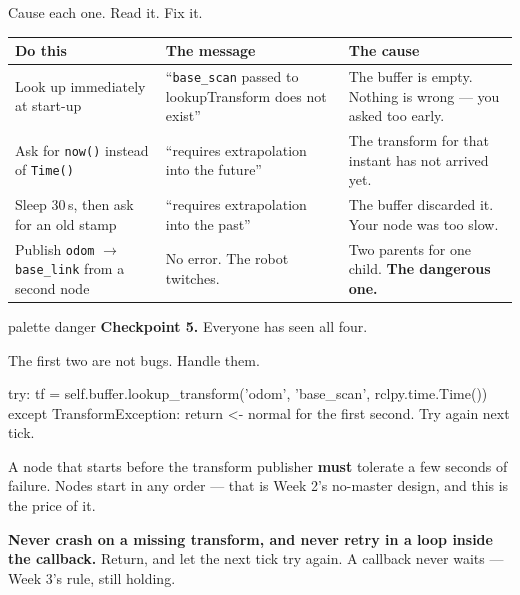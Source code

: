 \documentclass[aspectratio=169]{beamer}
\begin{document}
\begin{frame}{Cause each one. Read it. Fix it.}
  \footnotesize
  \begin{center}
  \begin{tabular}{@{}p{3.3cm}p{3.6cm}p{3.9cm}@{}}
    \toprule
    \textbf{Do this} & \textbf{The message} & \textbf{The cause} \\
    \midrule
    Look up immediately at start-up
      & ``\texttt{base\_scan} passed to lookupTransform does not exist''
      & The buffer is empty. Nothing is wrong --- you asked too early. \\[0.35em]
    Ask for \texttt{now()} instead of \texttt{Time()}
      & ``requires extrapolation into the future''
      & The transform for that instant has not arrived yet. \\[0.35em]
    Sleep 30\,s, then ask for an old stamp
      & ``requires extrapolation into the past''
      & The buffer discarded it. Your node was too slow. \\[0.35em]
    Publish \texttt{odom} $\rightarrow$ \texttt{base\_link} from a second node
      & No error. The robot twitches.
      & Two parents for one child. \textbf{The dangerous one.} \\
    \bottomrule
  \end{tabular}
  \end{center}

  \vspace{0.4em}
  \centering
  \begin{beamercolorbox}[sep=5pt,center,rounded=true]{palette danger}
    \footnotesize \textbf{Checkpoint 5.} Everyone has seen all four.
  \end{beamercolorbox}
\end{frame}

\begin{frame}[fragile]{The first two are not bugs. Handle them.}
  \begin{pycodes}
try:
    tf = self.buffer.lookup_transform('odom', 'base_scan',
                                      rclpy.time.Time())
except TransformException:
    return          <- normal for the first second. Try again next tick.
  \end{pycodes}

  \vspace{0.4em}
  \small
  A node that starts before the transform publisher \textbf{must} tolerate a few seconds of
  failure. Nodes start in any order --- that is Week 2's no-master design, and this is the
  price of it.

  \vspace{0.4em}
  \begin{inthefield}
    \footnotesize
    \textbf{Never crash on a missing transform, and never retry in a loop inside the callback.}
    Return, and let the next tick try again. A callback never waits --- Week 3's rule, still
    holding.
  \end{inthefield}
\end{frame}
\end{document}
